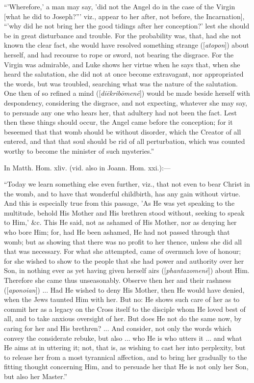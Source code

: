 ``'Wherefore,' a man may say, 'did not the Angel do in the case
of the Virgin [what he did to Joseph?''' viz., appear to her after,
not before, the Incarnation], ``'why did he not bring her the good
tidings after her conception?' lest she should be in great disturbance
and trouble. For the probability was, that, had she not known the clear
fact, she would have resolved something strange ([\emph{atopon}]) about
herself, and had recourse to rope or sword, not bearing the disgrace.
For the Virgin was admirable, and Luke shows her virtue when he says
that, when she heard the salutation, she did not at once become
extravagant, nor appropriated the words, but was troubled, searching
what was the nature of the salutation. One then of so refined a mind ([\emph{di\={e}krib\={o}men\={e}}])
would be made beside herself with despondency, considering the disgrace,
and not expecting, whatever she may say, to persuade any one who hears
her, that adultery had not been the fact. Lest then these things should
occur, the Angel came before the conception; for it beseemed that
that womb should be without disorder, which the Creator of all entered,
and that that soul should be rid of all perturbation, which was counted
worthy to become the minister of such mysteries.''


In Matth. Hom. xliv. (vid. also in Joann. Hom. xxi.):—


``Today we learn something else even further, viz., that not even
to bear Christ in the womb, and to have that wonderful childbirth, has
any gain without virtue. And this is especially true from this passage,
'As He was yet speaking to the multitude, behold His Mother and His
brethren stood without, seeking to speak to Him,' \&c. This He said,
not as ashamed of His Mother, nor as denying her who bore Him; for, had
He been ashamed, He had not passed through that womb; but as showing
that there was no profit to her thence, unless she did all that was
necessary. For what she attempted, came of overmuch love of honour; for
she wished to show to the people that she had power and authority over
her Son, in nothing ever as yet having given herself airs ([\emph{phantazomen\={e}}])
about Him. Therefore she came thus unseasonably. Observe then her and
their rashness ([\emph{aponoian}]) ... Had He wished to deny His Mother,
then He would have denied, when the Jews taunted Him with her. But no:
He shows such care of her as to commit her as a legacy on the Cross
itself to the disciple whom He loved best of all, and to take anxious
oversight of her. But does He not do the same now, by caring for her and
His brethren? ... And consider, not only the words which convey the
considerate rebuke, but also ... who He is who utters it ... and what He
aims at in uttering it; not, that is, as wishing to cast her into
perplexity, but to release her from a most tyrannical affection, and to
bring her gradually to the fitting thought concerning Him, and to
persuade her that He is not only her Son, but also her Master.''


